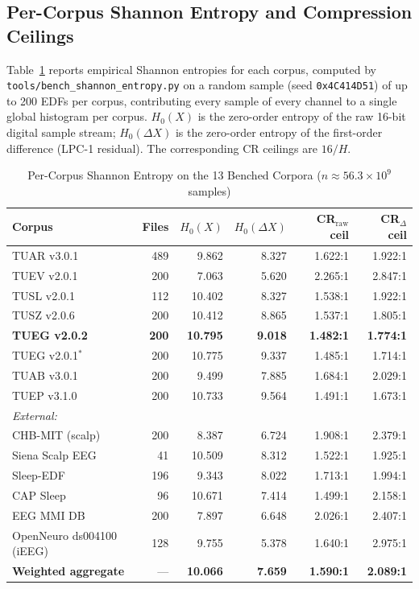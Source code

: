 \documentclass[journal]{IEEEtran}
\begin{document}
\subsection*{Per-Corpus Shannon Entropy and Compression Ceilings}

Table~\ref{tab:per-corpus-entropy} reports empirical Shannon
entropies for each corpus, computed by
\texttt{tools/bench\_shannon\_entropy.py} on a random sample (seed
\texttt{0x4C414D51}) of up to 200 EDFs per corpus, contributing
every sample of every channel to a single global histogram per
corpus. $H_0(X)$ is the zero-order entropy of the raw 16-bit
digital sample stream; $H_0(\Delta X)$ is the zero-order entropy
of the first-order difference (LPC-1 residual). The corresponding
CR ceilings are $16/H$.

\begin{table}[!t]
\renewcommand{\arraystretch}{1.3}
\caption{Per-Corpus Shannon Entropy on the 13 Benched Corpora
($n \approx 56.3 \times 10^9$ samples)}
\label{tab:per-corpus-entropy}
\centering
\begin{tabular}{lrrrrr}
\toprule
Corpus & Files & $H_0(X)$ & $H_0(\Delta X)$ & CR$_{\text{raw}}$ ceil & CR$_{\Delta}$ ceil \\
\midrule
TUAR v3.0.1 & 489 & 9.862  & 8.327 & 1.622:1 & 1.922:1 \\
TUEV v2.0.1 & 200 & 7.063  & 5.620 & 2.265:1 & 2.847:1 \\
TUSL v2.0.1 & 112 & 10.402 & 8.327 & 1.538:1 & 1.922:1 \\
TUSZ v2.0.6 & 200 & 10.412 & 8.865 & 1.537:1 & 1.805:1 \\
\textbf{TUEG v2.0.2} & \textbf{200} & \textbf{10.795} & \textbf{9.018} & \textbf{1.482:1} & \textbf{1.774:1} \\
TUEG v2.0.1$^\ast$ & 200 & 10.775 & 9.337 & 1.485:1 & 1.714:1 \\
TUAB v3.0.1 & 200 & 9.499  & 7.885 & 1.684:1 & 2.029:1 \\
TUEP v3.1.0 & 200 & 10.733 & 9.564 & 1.491:1 & 1.673:1 \\
\midrule
\multicolumn{6}{l}{\textit{External:}} \\
CHB-MIT (scalp)     & 200 & 8.387  & 6.724 & 1.908:1 & 2.379:1 \\
Siena Scalp EEG     &  41 & 10.509 & 8.312 & 1.522:1 & 1.925:1 \\
Sleep-EDF           & 196 & 9.343  & 8.022 & 1.713:1 & 1.994:1 \\
CAP Sleep           &  96 & 10.671 & 7.414 & 1.499:1 & 2.158:1 \\
EEG MMI DB          & 200 & 7.897  & 6.648 & 2.026:1 & 2.407:1 \\
OpenNeuro ds004100 (iEEG) & 128 & 9.755 & 5.378 & 1.640:1 & 2.975:1 \\
\midrule
\textbf{Weighted aggregate} & --- & \textbf{10.066} & \textbf{7.659} &
\textbf{1.590:1} & \textbf{2.089:1} \\
\bottomrule
\end{tabular}


\end{table}
\end{document}
